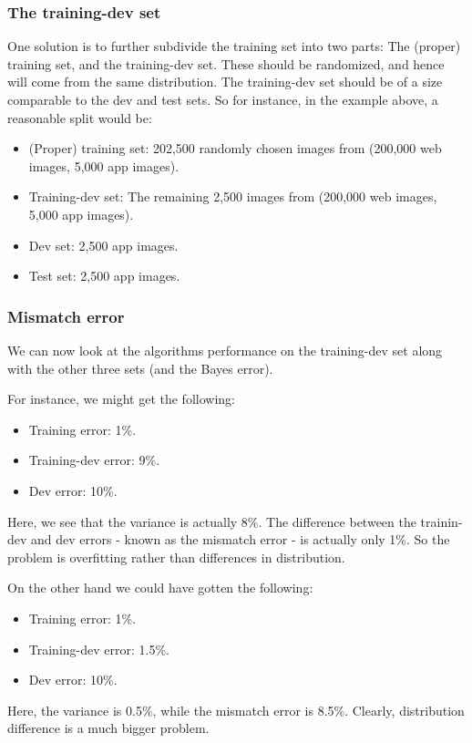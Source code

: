 \documentclass[12pt, a4paper]{article}
\numberwithin{equation}{section}
\begin{document}
\subsubsection{The training-dev set}
One solution is to further subdivide the training set into two parts: The (proper) training set, and the training-dev set. These should be randomized, and hence will come from the same distribution. The training-dev set should be of a size comparable to the dev and test sets. So for instance, in the example above, a reasonable split would be:
\begin{itemize}
\item (Proper) training set: 202,500 randomly chosen images from (200,000 web images, 5,000 app images).
\item Training-dev set: The remaining 2,500 images from (200,000 web images, 5,000 app images).
\item Dev set: 2,500 app images.
\item Test set: 2,500 app images.
\end{itemize} 

\subsubsection{Mismatch error}
We can now look at the algorithms performance on the training-dev set along with the other three sets (and the Bayes error).

For instance, we might get the following:
\begin{itemize}
\item Training error: 1\%.
\item Training-dev error: 9\%.
\item Dev error: 10\%.
\end{itemize}
Here, we see that the variance is actually 8\%. The difference between the trainin-dev and dev errors - known as the mismatch error - is actually only 1\%. So the problem is overfitting rather than differences in distribution.

On the other hand we could have gotten the following:
\begin{itemize}
\item Training error: 1\%.
\item Training-dev error: 1.5\%.
\item Dev error: 10\%.
\end{itemize}
Here, the variance is 0.5\%, while the mismatch error is 8.5\%. Clearly, distribution difference is a much bigger problem.
\end{document}

